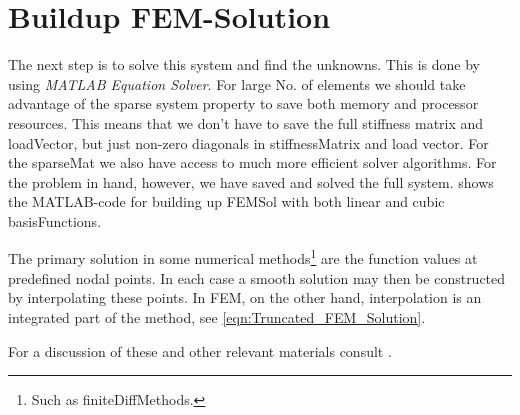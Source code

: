 \section{Buildup FEM-Solution}
The next step is to solve this system and find the unknowns. This is done by using \emph{MATLAB Equation Solver}. For large No.
of elements we should take advantage of the sparse system property to save both memory and processor resources. This means that
we don't have to save the full stiffness matrix and \gls{loadVector}, but just non-zero diagonals in \gls{stiffnessMatrix} and load vector.
For the \gls{sparseMat} we also have access to much more efficient solver \glspl{algorithm}. For the problem in hand,
however, we have saved and solved the full system.  shows the MATLAB-code for building up \gls{FEMSol} with
both linear and cubic \glspl{basisFunction}.
\begin{remark}
	The primary solution in some numerical methods\footnote{Such as \glspl{finiteDiffMethod}.} are the function values at
	predefined nodal points. In each case a smooth solution may then be constructed by interpolating these points. In FEM, on the
	other hand, interpolation is an integrated part of the method, see \cref{eqn:Truncated_FEM_Solution}.
\end{remark}	\text{}
For a discussion of these and other relevant materials consult \cite{Bertoti:1997,Carlson:1967,KarelRektorys:1975,Szeidl:2001}.